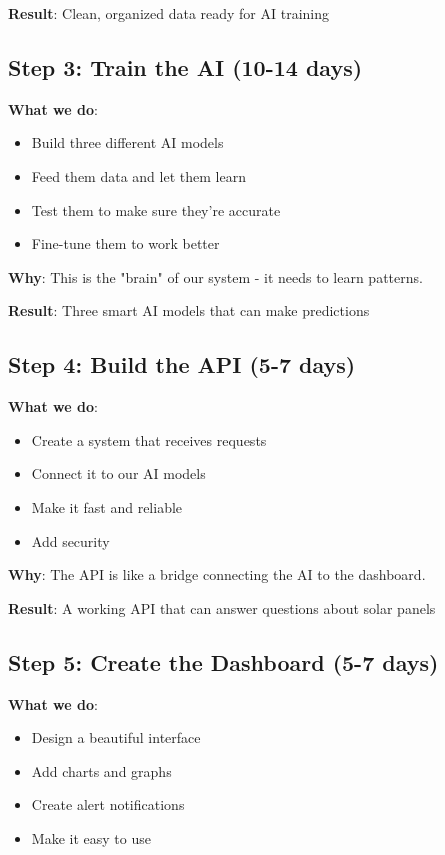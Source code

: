 \documentclass[12pt,a4paper]{article}
\begin{document}
\textbf{Result}: Clean, organized data ready for AI training

\subsection{Step 3: Train the AI (10-14 days)}

\textbf{What we do}:
\begin{itemize}[leftmargin=*]
    \item Build three different AI models
    \item Feed them data and let them learn
    \item Test them to make sure they're accurate
    \item Fine-tune them to work better
\end{itemize}

\textbf{Why}: This is the "brain" of our system - it needs to learn patterns.

\textbf{Result}: Three smart AI models that can make predictions

\subsection{Step 4: Build the API (5-7 days)}

\textbf{What we do}:
\begin{itemize}[leftmargin=*]
    \item Create a system that receives requests
    \item Connect it to our AI models
    \item Make it fast and reliable
    \item Add security
\end{itemize}

\textbf{Why}: The API is like a bridge connecting the AI to the dashboard.

\textbf{Result}: A working API that can answer questions about solar panels

\subsection{Step 5: Create the Dashboard (5-7 days)}

\textbf{What we do}:
\begin{itemize}[leftmargin=*]
    \item Design a beautiful interface
    \item Add charts and graphs
    \item Create alert notifications
    \item Make it easy to use
\end{itemize}
\end{document}
